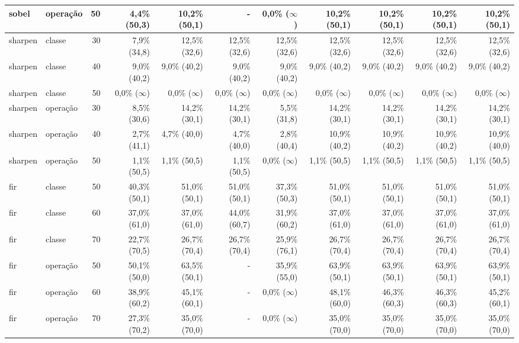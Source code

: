 \begin{table}[htbp]
\begin{tabular}{|l|l|r|r|r|r|r|r|r|r|r|}
sobel & operação & 50 & 4,4\% (50,3) & 10,2\% (50,1) & - & 0,0\% ($\infty$) & 10,2\% (50,1) & 10,2\% (50,1) & 10,2\% (50,1) & 10,2\% (50,1) \\ \hline
sharpen & classe & 30 & 7,9\% (34,8) & 12,5\% (32,6) & 12,5\% (32,6) & 12,5\% (32,6) & 12,5\% (32,6) & 12,5\% (32,6) & 12,5\% (32,6) & 12,5\% (32,6) \\ \hline
sharpen & classe & 40 & 9,0\% (40,2) & 9,0\% (40,2) & 9,0\% (40,2) & 9,0\% (40,2) & 9,0\% (40,2) & 9,0\% (40,2) & 9,0\% (40,2) & 9,0\% (40,2) \\ \hline
sharpen & classe & 50 & 0,0\% ($\infty$) & 0,0\% ($\infty$) & 0,0\% ($\infty$) & 0,0\% ($\infty$) & 0,0\% ($\infty$) & 0,0\% ($\infty$) & 0,0\% ($\infty$) & 0,0\% ($\infty$) \\ \hline
sharpen & operação & 30 & 8,5\% (30,6) & 14,2\% (30,1) & 14,2\% (30,1) & 5,5\% (31,8) & 14,2\% (30,1) & 14,2\% (30,1) & 14,2\% (30,1) & 14,2\% (30,1) \\ \hline
sharpen & operação & 40 & 2,7\% (41,1) & 4,7\% (40,0) & 4,7\% (40,0) & 2,8\% (40,4) & 10,9\% (40,2) & 10,9\% (40,2) & 10,9\% (40,2) & 10,9\% (40,0) \\ \hline
sharpen & operação & 50 & 1,1\% (50,5) & 1,1\% (50,5) & 1,1\% (50,5) & 0,0\% ($\infty$) & 1,1\% (50,5) & 1,1\% (50,5) & 1,1\% (50,5) & 1,1\% (50,5) \\ \hline
fir & classe & 50 & 40,3\% (50,1) & 51,0\% (50,1) & 51,0\% (50,1) & 37,3\% (50,3) & 51,0\% (50,1) & 51,0\% (50,1) & 51,0\% (50,1) & 51,0\% (50,1) \\ \hline
fir & classe & 60 & 37,0\% (61,0) & 37,0\% (61,0) & 44,0\% (60,7) & 31,9\% (60,2) & 37,0\% (61,0) & 37,0\% (61,0) & 37,0\% (61,0) & 37,0\% (61,0) \\ \hline
fir & classe & 70 & 22,7\% (70,5) & 26,7\% (70,4) & 26,7\% (70,4) & 25,9\% (76,1) & 26,7\% (70,4) & 26,7\% (70,4) & 26,7\% (70,4) & 26,7\% (70,4) \\ \hline
fir & operação & 50 & 50,1\% (50,0) & 63,5\% (50,1) & - & 35,9\% (55,0) & 63,9\% (50,1) & 63,9\% (50,1) & 63,9\% (50,1) & 63,9\% (50,1) \\ \hline
fir & operação & 60 & 38,9\% (60,2) & 45,1\% (60,1) & - & 0,0\% ($\infty$) & 48,1\% (60,0) & 46,3\% (60,3) & 46,3\% (60,3) & 45,2\% (60,1) \\ \hline
fir & operação & 70 & 27,3\% (70,2) & 35,0\% (70,0) & - & 0,0\% ($\infty$) & 35,0\% (70,0) & 35,0\% (70,0) & 35,0\% (70,0) & 35,0\% (70,0) \\ \hline
\end{tabular}
\end{table}

